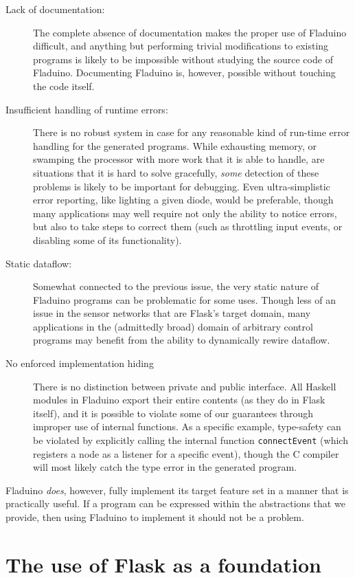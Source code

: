\documentclass[a4paper, oneside, final]{memoir}
\begin{document}
\begin{description}
\item[Lack of documentation:] The complete absence of documentation
  makes the proper use of Fladuino difficult, and anything but
  performing trivial modifications to existing programs is likely to
  be impossible without studying the source code of Fladuino.
  Documenting Fladuino is, however, possible without touching the code
  itself.
\item[Insufficient handling of runtime errors:] There is no robust
  system in case for any reasonable kind of run-time error handling
  for the generated programs.  While exhausting memory, or swamping
  the processor with more work that it is able to handle, are
  situations that it is hard to solve gracefully, \textit{some}
  detection of these problems is likely to be important for debugging.
  Even ultra-simplistic error reporting, like lighting a given diode,
  would be preferable, though many applications may well require not
  only the ability to notice errors, but also to take steps to correct
  them (such as throttling input events, or disabling some of its
  functionality).
\item[Static dataflow:] Somewhat connected to the previous issue, the
  very static nature of Fladuino programs can be problematic for some
  uses.  Though less of an issue in the sensor networks that are
  Flask's target domain, many applications in the (admittedly broad)
  domain of arbitrary control programs may benefit from the ability to
  dynamically rewire dataflow.
\item[No enforced implementation hiding] There is no distinction
  between private and public interface.  All Haskell modules in
  Fladuino export their entire contents (as they do in Flask itself),
  and it is possible to violate some of our guarantees through
  improper use of internal functions.  As a specific example,
  type-safety can be violated by explicitly calling the internal
  function \texttt{connectEvent} (which registers a node as a listener
  for a specific event), though the C compiler will most likely catch
  the type error in the generated program.
\end{description}

Fladuino \textit{does}, however, fully implement its target feature
set in a manner that is practically useful.  If a program can be
expressed within the abstractions that we provide, then using Fladuino
to implement it should not be a problem.

\section{The use of Flask as a foundation}
\end{document}

